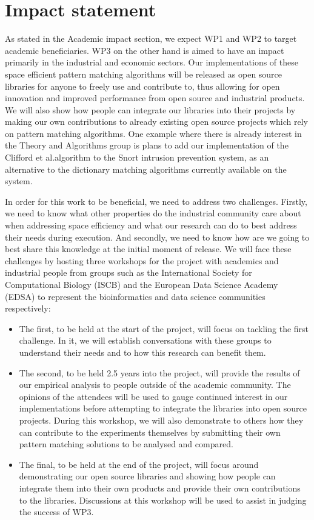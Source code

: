 \documentclass[a4paper,11pt]{article}
\begin{document}
    \newpage
    \section{Impact statement}

    As stated in the Academic impact section, we expect WP1 and WP2 to target academic beneficiaries. WP3 on the other hand is aimed to have an impact primarily in the industrial and economic sectors. Our implementations of these space efficient pattern matching algorithms will be released as open source libraries for anyone to freely use and contribute to, thus allowing for open innovation and improved performance from open source and industrial products. We will also show how people can integrate our libraries into their projects by making our own contributions to already existing open source projects which rely on pattern matching algorithms. One example where there is already interest in the Theory and Algorithms group is plans to add our implementation of the Clifford et al.\@ algorithm to the Snort intrusion prevention system, as an alternative to the dictionary matching algorithms currently available on the system.

    In order for this work to be beneficial, we need to address two challenges. Firstly, we need to know what other properties do the industrial community care about when addressing space efficiency and what our research can do to best address their needs during execution. And secondly, we need to know how are we going to best share this knowledge at the initial moment of release. We will face these challenges by hosting three workshops for the project with academics and industrial people from groups such as the International Society for Computational Biology (ISCB) and the European Data Science Academy (EDSA) to represent the bioinformatics and data science communities respectively:

    \begin{itemize}
        \item The first, to be held at the start of the project, will focus on tackling the first challenge. In it, we will establish conversations with these groups to understand their needs and to how this research can benefit them.
        \item The second, to be held 2.5 years into the project, will provide the results of our empirical analysis to people outside of the academic community. The opinions of the attendees will be used to gauge continued interest in our implementations before attempting to integrate the libraries into open source projects. During this workshop, we will also demonstrate to others how they can contribute to the experiments themselves by submitting their own pattern matching solutions to be analysed and compared.
        \item The final, to be held at the end of the project, will focus around demonstrating our open source libraries and showing how people can integrate them into their own products and provide their own contributions to the libraries. Discussions at this workshop will be used to assist in judging the success of WP3.
    \end{itemize}
\end{document}
